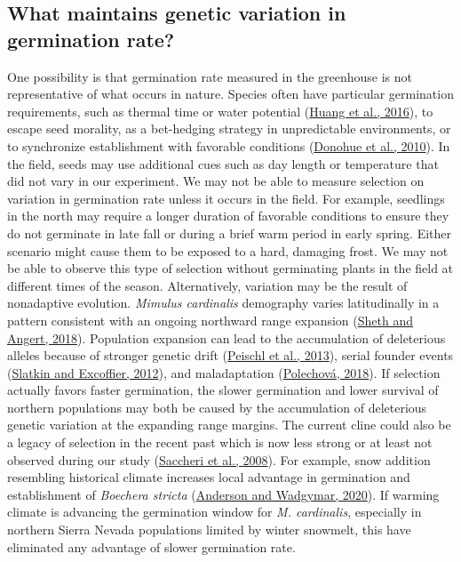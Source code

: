 \documentclass[
  12pt,
]{article}
\begin{document}
\hypertarget{what-maintains-genetic-variation-in-germination-rate}{%
\subsection{What maintains genetic variation in germination rate?}\label{what-maintains-genetic-variation-in-germination-rate}}

One possibility is that germination rate measured in the greenhouse is not representative of what occurs in nature. Species often have particular germination requirements, such as thermal time or water potential (\protect\hyperlink{ref-huang_contribution_2016}{Huang et al., 2016}), to escape seed morality, as a bet-hedging strategy in unpredictable environments, or to synchronize establishment with favorable conditions (\protect\hyperlink{ref-donohue_germination_2010}{Donohue et al., 2010}). In the field, seeds may use additional cues such as day length or temperature that did not vary in our experiment. We may not be able to measure selection on variation in germination rate unless it occurs in the field. For example, seedlings in the north may require a longer duration of favorable conditions to ensure they do not germinate in late fall or during a brief warm period in early spring. Either scenario might cause them to be exposed to a hard, damaging frost. We may not be able to observe this type of selection without germinating plants in the field at different times of the season. Alternatively, variation may be the result of nonadaptive evolution. \emph{Mimulus cardinalis} demography varies latitudinally in a pattern consistent with an ongoing northward range expansion (\protect\hyperlink{ref-sheth_demographic_2018}{Sheth and Angert, 2018}). Population expansion can lead to the accumulation of deleterious alleles because of stronger genetic drift (\protect\hyperlink{ref-peischl_accumulation_2013}{Peischl et al., 2013}), serial founder events (\protect\hyperlink{ref-slatkin_serial_2012}{Slatkin and Excoffier, 2012}), and maladaptation (\protect\hyperlink{ref-polechova_is_2018}{Polechová, 2018}). If selection actually favors faster germination, the slower germination and lower survival of northern populations may both be caused by the accumulation of deleterious genetic variation at the expanding range margins. The current cline could also be a legacy of selection in the recent past which is now less strong or at least not observed during our study (\protect\hyperlink{ref-saccheri_selection_2008}{Saccheri et al., 2008}). For example, snow addition resembling historical climate increases local advantage in germination and establishment of \emph{Boechera stricta} (\protect\hyperlink{ref-anderson_climate_2020}{Anderson and Wadgymar, 2020}). If warming climate is advancing the germination window for \emph{M. cardinalis}, especially in northern Sierra Nevada populations limited by winter snowmelt, this have eliminated any advantage of slower germination rate.
\end{document}
